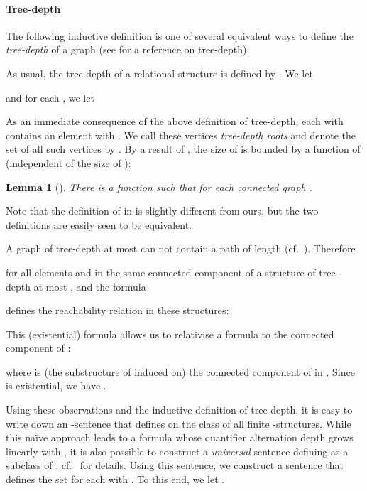 \documentclass[11pt]{article}
\newtheorem{lemma}[theorem]{Lemma}
\begin{document}
\paragraph{Tree-depth}

The following inductive definition is one of several equivalent ways
to define the \emph{tree-depth}  of a graph
(see \cite{NesetrilMendez2012} for a reference on tree-depth):


As usual, the tree-depth  of a relational structure  is
defined by . We let

and for each , we let


As an immediate consequence of the above definition of tree-depth, each  with  contains an element  with . We call these vertices \emph{tree-depth roots}
and denote the set of all such vertices by . By a result of
\cite{BoulandDK12}, the size of  is bounded by a function of 
(independent of the size of ): 

\begin{lemma}[{\cite[Lem. 7]{BoulandDK12}}]
  \label{lem:roots}
  There is a function  such that
   for each connected graph .
\end{lemma}

Note that the definition of  in \cite{BoulandDK12} is slightly
different from ours, but the two definitions are easily seen to be equivalent.

A graph of tree-depth at most  can not contain a path of length
 (cf.~\cite[6.2]{NesetrilMendez2012}). Therefore

for all elements  and  in the same connected component of a
structure  of tree-depth at most , and the formula

defines the reachability relation in these structures:

This (existential) formula allows us to relativise a formula
 to the connected component of :

where  is (the substructure of  induced on) the connected component of
 in .  Since  is existential, we have
 .

Using these observations and the inductive definition of tree-depth,
it is easy to write down an -sentence that defines
 on the class of all finite
-structures. While this na\"ive approach leads to a formula
whose quantifier alternation depth grows linearly with , it is also
possible to construct a \emph{universal} sentence 
defining  as a subclass of ,
cf.~\cite[Section~6.10]{NesetrilMendez2012} for details.
Using this sentence, we construct a sentence that defines the set  for each  with . To this end, we let . 
\end{document}

